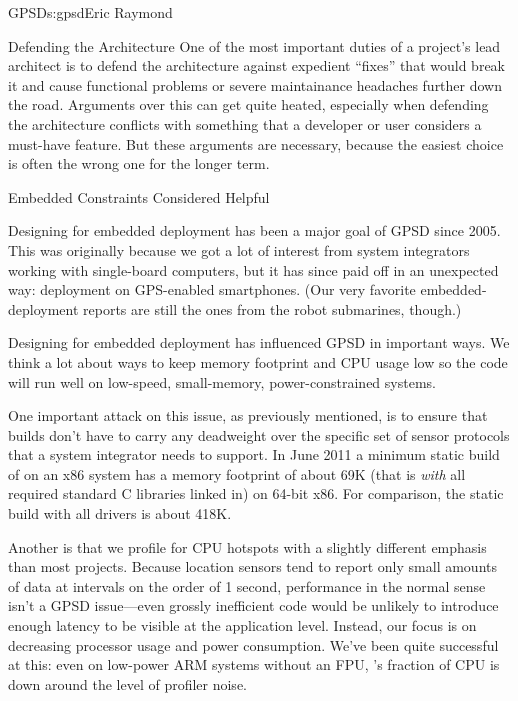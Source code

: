 \begin{aosachapter}{GPSD}{s:gpsd}{Eric Raymond}
\begin{aosasect1}{Defending the Architecture}
One of the most important duties of a project's lead architect is to
defend the architecture against expedient ``fixes'' that would break
it and cause functional problems or severe maintainance headaches
further down the road.  Arguments over this can get quite heated,
especially when defending the architecture conflicts with something
that a developer or user considers a must-have feature.  But these
arguments are necessary, because the easiest choice is often the wrong
one for the longer term.

\end{aosasect1}

\begin{aosasect1}{Embedded Constraints Considered Helpful}

Designing for embedded deployment has been a major goal of GPSD since
2005. This was originally because we got a lot of interest from system
integrators working with single-board computers, but it has since paid
off in an unexpected way: deployment on GPS-enabled smartphones. (Our
very favorite embedded-deployment reports are still the ones from the
robot submarines, though.)

Designing for embedded deployment has influenced GPSD in important
ways.  We think a lot about ways to keep memory footprint and CPU
usage low so the code will run well on low-speed, small-memory,
power-constrained systems.

One important attack on this issue, as previously mentioned, is to
ensure that  builds don't have to carry any deadweight over
the specific set of sensor protocols that a system integrator needs to
support. In June 2011 a minimum static build of  on an x86
system has a memory footprint of about 69K (that is \emph{with} all
required standard C libraries linked in) on 64-bit x86. For
comparison, the static build with all drivers is about 418K.

Another is that we profile for CPU hotspots with a slightly different
emphasis than most projects. Because location sensors tend to report
only small amounts of data at intervals on the order of 1 second,
performance in the normal sense isn't a GPSD issue---even grossly
inefficient code would be unlikely to introduce enough latency to be
visible at the application level.  Instead, our focus is on decreasing
processor usage and power consumption.  We've been quite successful at
this: even on low-power ARM systems without an FPU, 's
fraction of CPU is down around the level of profiler noise.


\end{aosasect1}
\end{aosachapter}
